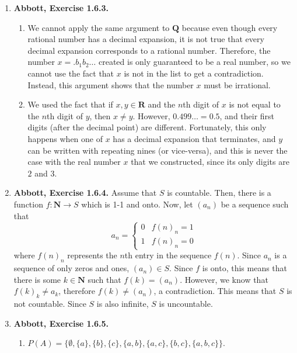 \documentclass{article}
\newcommand{\N}{\mathbf{N}}
\newcommand{\Q}{\mathbf{Q}}
\newcommand{\R}{\mathbf{R}}
\newcommand{\exc}[2][Abbott]{\item \textbf{#1, Exercise #2.}}
\begin{document}
\begin{enumerate}
	\exc{1.6.3}
				      	          
	\begin{enumerate}
		\item We cannot apply the same argument to $\Q$ because even though every rational number has a decimal expansion, it is not true that every decimal expansion corresponds to a rational number. Therefore, the number $x = .b_1b_2 \dots$ created is only guaranteed to be a real number, so we cannot use the fact that $x$ is not in the list to get a contradiction. Instead, this argument shows that the number $x$ must be irrational.
		      		      		      	      	      	      	              
		\item We used the fact that if $x, y \in \R$ and the $n$th digit of $x$ is not equal to the $n$th digit of $y$, then $x \neq y$. However, $0.499\dots = 0.5$, and their first digits (after the decimal point) are different. Fortunately, this only happens when one of $x$ has a decimal expansion that terminates, and $y$ can be written with repeating nines (or vice-versa), and this is never the case with the real number $x$ that we constructed, since its only digits are $2$ and $3$. 
	\end{enumerate}
				      	          
	\exc{1.6.4}
	Assume that $S$ is countable. Then, there is a function $f : \N \rightarrow S$ which is 1-1 and onto. Now, let $(a_n)$ be a sequence such that \begin{equation*}
	a_n = \begin{cases}
	0 & f(n)_n = 1 \\ 
	1 & f(n)_n = 0
	\end{cases}
	\end{equation*}
	where $f(n)_n$ represents the $n$th entry in the sequence $f(n)$. Since $a_n$ is a sequence of only zeros and ones, $(a_n) \in S$. Since $f$ is onto, this means that there is some $k \in \N$ such that $f(k) = (a_n)$. However, we know that $f(k)_k \neq a_k$, therefore $f(k) \neq (a_n)$, a contradiction. This means that $S$ is not countable. Since $S$ is also infinite, $S$ is uncountable.
					    
	\exc{1.6.5}
				      	          
	\begin{enumerate}
		\item $P(A) = \{\emptyset, \{a\}, \{b\}, \{c\}, \{a, b\}, \{a, c\}, \{b, c\}, \{a, b, c\}\}$.
		      		      		      	      	      	      	              

\end{enumerate}
\end{enumerate}
\end{document}
